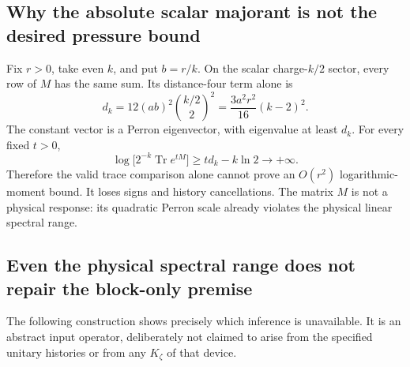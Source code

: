 \subsection{Why the absolute scalar majorant is not the desired pressure bound}

Fix $r>0$, take even $k$, and put $b=r/k$.
On the scalar charge-$k/2$ sector, every row of $M$ has the same sum.
Its distance-four term alone is
\[
 d_k=12(ab)^2\binom{k/2}{2}^2
     =\frac{3a^2r^2}{16}(k-2)^2.
\]
The constant vector is a Perron eigenvector, with eigenvalue at least
$d_k$. For every fixed $t>0$,
\[
 \log\bigl[2^{-k}\operatorname{Tr}e^{tM}\bigr]
 \ge td_k-k\ln2\longrightarrow+\infty.
\]
Therefore the valid trace comparison alone cannot prove an
$O(r^2)$ logarithmic-moment bound. It loses signs and history
cancellations. The matrix $M$ is not a physical response: its quadratic
Perron scale already violates the physical linear spectral range.

\subsection{Even the physical spectral range does not repair the block-only premise}

The following construction shows precisely which inference is unavailable.
It is an abstract input operator, deliberately not claimed to arise from
the specified unitary histories or from any $K_\zeta$ of that device.

